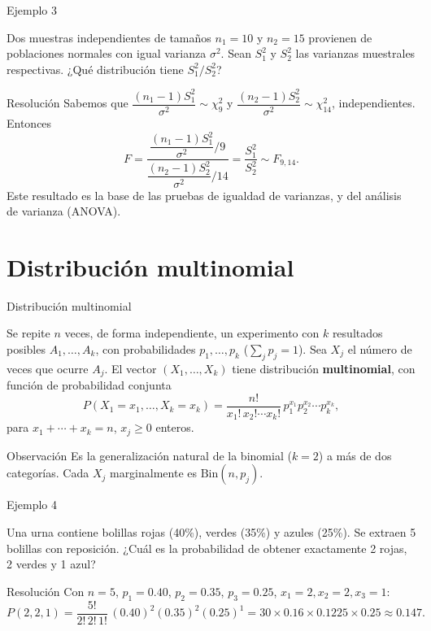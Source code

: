 \documentclass[aspectratio=169,11pt]{beamer}
\begin{document}
\begin{frame}{Ejemplo 3}
\begin{example}
Dos muestras independientes de tamaños $n_1=10$ y $n_2=15$ provienen de poblaciones normales con igual varianza $\sigma^2$. Sean $S_1^2$ y $S_2^2$ las varianzas muestrales respectivas. ¿Qué distribución tiene $S_1^2/S_2^2$?
\end{example}
\pause
\begin{block}{Resolución}
Sabemos que $\dfrac{(n_1-1)S_1^2}{\sigma^2}\sim\chi^2_{9}$ y $\dfrac{(n_2-1)S_2^2}{\sigma^2}\sim\chi^2_{14}$, independientes. Entonces
\[
F = \frac{\dfrac{(n_1-1)S_1^2}{\sigma^2}\Big/9}{\dfrac{(n_2-1)S_2^2}{\sigma^2}\Big/14} = \frac{S_1^2}{S_2^2} \sim F_{9,14}.
\]
Este resultado es la base de las pruebas de igualdad de varianzas, y del análisis de varianza (ANOVA).
\end{block}
\end{frame}

\section{Distribución multinomial}

\begin{frame}{Distribución multinomial}
\begin{definition}[Multinomial]
Se repite $n$ veces, de forma independiente, un experimento con $k$ resultados posibles $A_1,\ldots,A_k$, con probabilidades $p_1,\ldots,p_k$ ($\sum_j p_j=1$). Sea $X_j$ el número de veces que ocurre $A_j$. El vector $(X_1,\ldots,X_k)$ tiene distribución \textbf{multinomial}, con función de probabilidad conjunta
\[
P(X_1=x_1,\ldots,X_k=x_k) = \frac{n!}{x_1!\, x_2!\cdots x_k!}\, p_1^{x_1} p_2^{x_2}\cdots p_k^{x_k},
\]
para $x_1+\cdots+x_k=n$, $x_j\ge 0$ enteros.
\end{definition}
\begin{block}{Observación}
Es la generalización natural de la binomial ($k=2$) a más de dos categorías. Cada $X_j$ marginalmente es $\text{Bin}(n,p_j)$.
\end{block}
\end{frame}

\begin{frame}{Ejemplo 4}
\begin{example}
Una urna contiene bolillas rojas (40\%), verdes (35\%) y azules (25\%). Se extraen 5 bolillas con reposición. ¿Cuál es la probabilidad de obtener exactamente 2 rojas, 2 verdes y 1 azul?
\end{example}
\pause
\begin{block}{Resolución}
Con $n=5$, $p_1=0.40$, $p_2=0.35$, $p_3=0.25$, $x_1=2,x_2=2,x_3=1$:
\[
P(2,2,1) = \frac{5!}{2!\,2!\,1!}\,(0.40)^2(0.35)^2(0.25)^1 = 30\times 0.16\times 0.1225\times 0.25 \approx 0.147.
\]
\end{block}
\end{frame}
\end{document}

